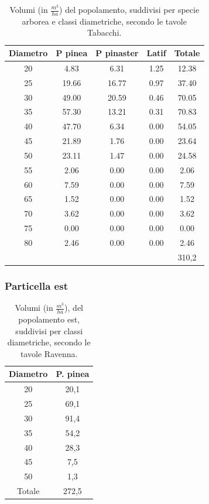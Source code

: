 \begin{table}[H]
\caption{Volumi (in $\frac{m^3}{ha}$) del popolamento, suddivisi per specie arborea e classi diametriche, secondo le tavole Tabacchi.}
\centering
\begin{tabular}{ccccc}
\toprule
Diametro & P pinea & P pinaster & Latif & Totale \\
\midrule
     20    & 4.83    & 6.31       & 1.25  & 12.38  \\
   25  & 19.66   & 16.77      & 0.97  & 37.40  \\
   30      & 49.00   & 20.59      & 0.46  & 70.05  \\
    35     & 57.30   & 13.21      & 0.31  & 70.83  \\
    40     & 47.70   & 6.34       & 0.00  & 54.05  \\
      45   & 21.89   & 1.76       & 0.00  & 23.64  \\
    50     & 23.11   & 1.47       & 0.00  & 24.58  \\
    55     & 2.06    & 0.00       & 0.00  & 2.06   \\
      60   & 7.59    & 0.00       & 0.00  & 7.59   \\
    65     & 1.52    & 0.00       & 0.00  & 1.52   \\
      70   & 3.62    & 0.00       & 0.00  & 3.62   \\
    75     & 0.00    & 0.00       & 0.00  & 0.00   \\
     80    & 2.46    & 0.00       & 0.00  & 2.46  \\
     \midrule
     &&&& 310,2\\
     \bottomrule
\end{tabular}
\end{table}

\subsubsection*{Particella est}
\begin{table}[H]
\caption{Volumi (in $\frac{m^3}{ha}$), del popolamento est, suddivisi per classi diametriche, secondo le tavole Ravenna.}
\centering
\begin{tabular}{cc}
\toprule
Diametro & P. pinea \\
\midrule
20       & 20,1    \\
25       & 69,1     \\
30       & 91,4     \\
35       & 54,2     \\
40       & 28,3    \\
45       & 7,5     \\
50       & 1,3  \\
\midrule
Totale & 272,5 \\
\bottomrule
\end{tabular}
\label{tab:volumi_ravenna_ettaro_est}
\end{table}

